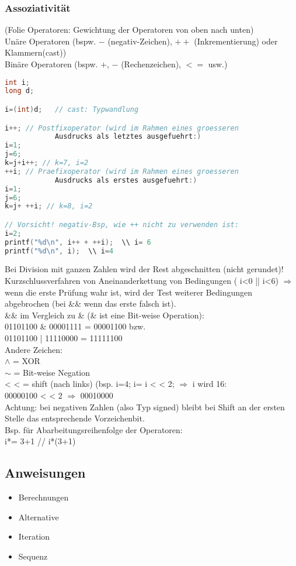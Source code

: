 \subsubsection{Assoziativität}
(Folie Operatoren: Gewichtung der Operatoren von oben nach unten)\medskip\\
Unäre Operatoren (bspw. $-$ (negativ-Zeichen), $++$ (Inkrementierung) oder Klammern(cast))\\
Binäre Operatoren (bspw. $+$, $-$ (Rechenzeichen), $<=$ usw.)
\begin{lstlisting}[language=C]
int i;
long d;

i=(int)d;	// cast: Typwandlung

i++; // Postfixoperator (wird im Rahmen eines groesseren 
			Ausdrucks als letztes ausgefuehrt:)
i=1;
j=6;
k=j+i++; // k=7, i=2
++i; // Praefixoperator (wird im Rahmen eines groesseren 
			Ausdrucks als erstes ausgefuehrt:)
i=1;
j=6;
k=j+ ++i; // k=8, i=2

// Vorsicht! negativ-Bsp, wie ++ nicht zu verwenden ist:
i=2;
printf("%d\n", i++ + ++i);	\\ i= 6
printf("%d\n", i);	\\ i=4
\end{lstlisting}
Bei Division mit ganzen Zahlen wird der Rest abgeschnitten (nicht gerundet)!\medskip\\
Kurzschlussverfahren von Aneinanderkettung von Bedingungen ( i<0 || i<6) $\Rightarrow$ wenn die erste Prüfung wahr ist, wird der Test weiterer Bedingungen abgebrochen (bei \&\& wenn das erste falsch ist).\bigskip\\
\&\& im Vergleich zu \& (\& ist eine Bit-weise Operation): \\
01101100 \& 00001111 = 00001100 bzw. \\
01101100 | 11110000 = 11111100 \smallskip\\
Andere Zeichen: \\
$\wedge$ = XOR\\
$\sim$ = Bit-weise Negation\\
<\! < = shift (nach links) (bsp. i=4; i= i <\! < 2; $\Rightarrow$ i wird 16:\\
00000100 <\! < 2 $\Rightarrow$ 00010000\\
Achtung: bei negativen Zahlen (also Typ signed) bleibt bei Shift an der ersten Stelle das entsprechende Vorzeichenbit.\\
Bsp. für Abarbeitungsreihenfolge der Operatoren:\\
i*= 3+1		// i*(3+1)
\subsection{Anweisungen}
\begin{itemize}
\item Berechnungen
\item Alternative
\item Iteration
\item Sequenz
\end{itemize}
